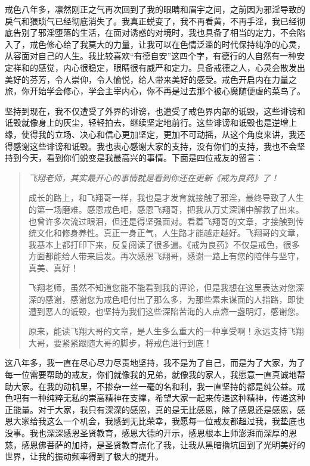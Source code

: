 戒色八年多，凛然刚正之气再次回到了我的眼睛和眉宇之间，之前因为邪淫导致的戾气和猥琐气已经彻底消失了。我真正蜕变了，我不再看黄，不再手淫，我已经彻底告别了邪淫堕落的生活，在面对诱惑的对境时，我也具备了相当的定力，不会陷入了，戒色修心给了我莫大的力量，让我可以在色情泛滥的时代保持纯净的心灵，从容面对自己的人生。我比较喜欢“有德自安”这四个字，有德行的人自然有一种安定祥和的感觉，内心很稳定，眼睛很有威严和定力。具备戒德之人，心灵会散发出美好的芬芳，令人崇仰，令人愉悦，给人带来美好的感受。戒色开启内在力量之旅，你开始学会修心，学会主宰内心，你不再是过去那个被心魔随便虐的菜鸟了。

坚持到现在，我不仅遭受了外界的诽谤，也遭受了戒色界内部的诋毁，这些诽谤和诋毁就像身上的灰尘，轻轻拍去，继续坚定地前行。这些诽谤和诋毁也是逆增上缘，使得我的立场、决心和信心更加坚定，更加不可动摇，从这个角度来讲，我还得感谢这些诽谤和诋毁。我也衷心感谢大家的支持，没有你们的支持，我也不会坚持到今天，看到你们蜕变是我最高兴的事情。下面是四位戒友的留言：

\begin{quotation}\it
    飞翔老师，其实最开心的事情就是看到你还在更新《戒为良药》了！

    成长的路上，和飞翔哥一样，我也是才发育就接触了邪淫，最终导致了人生的第一场磨难。感恩戒色吧，感恩飞翔哥，把我从万丈深渊中解救了出来。也曾许多次流过眼泪，但还是得坚强面对。看着飞翔哥的文章，才接触到传统文化和修身养性。真正一身正气，人生路才能越走越好。飞翔哥的文章，我基本上都打印下来，反复阅读了很多遍。《戒为良药》不仅是戒色，很多方面都能给人带来启发。再次感恩飞翔哥，感谢一路上有您的陪伴与坚守，真美、真好！

    飞翔老师，虽然不知道您能不能看到我的评论，但是我想在这里表达对您深深的感谢，感谢您为戒色吧付出了那么多，为那些素未谋面的人指路，即使遭到恶人的诋毁，也坚持为我们这些深陷苦海的人点燃一盏明灯，感谢您。

    原来，能读飞翔大哥的文章，是人生多么重大的一种享受啊！永远支持飞翔大哥，要紧紧跟随大哥的脚步，将戒色进行到底！
\end{quotation}

这八年多，我一直在尽心尽力尽责地坚持，我不是为了自己，而是为了大家，为了每一位需要帮助的戒友，你们就像我的兄弟，就像我的家人，我愿意一直真诚地帮助大家。在我的动机里，不掺杂一丝一毫的名和利，我一直坚持的都是纯公益。戒色吧有一种纯粹无私的崇高精神在支撑，希望大家一起来传递这种精神，传递这种正能量。对于大家，我只有深深的感恩，真的是无比感恩，除了感恩还是感恩，感恩大家给我这么一个机会，我感到无比荣幸，我愿每一位戒友都超过我，我垫底也没事。我也深深感恩圣贤教育，感恩大德的开示，感恩根本上师澎湃而深厚的恩慈，感恩佛菩萨的加持，是圣贤教育点化了我，让我从黑暗撸坑回到了光明美好的世界，让我的振动频率得到了极大的提升。

